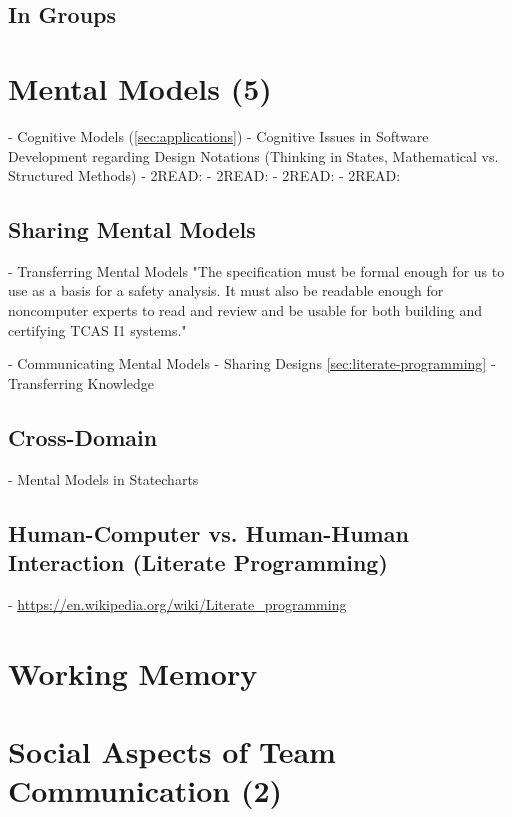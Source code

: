 \subsection{In Groups}

\section{Mental Models (5)}
- Cognitive Models (\ref{sec:applications}) \autocite[276]{kitchenham_research_1990}
- Cognitive Issues in Software Development regarding Design Notations (Thinking in States, Mathematical vs. Structured Methods) \autocite[281--282]{kitchenham_research_1990}
- 2READ: \autocite{gentner_mental_2014}
- 2READ: \autocite{dutke_mentale_1994}
- 2READ: \autocite{herczeg_software-ergonomie_2018}
- 2READ: \autocite{wandmacher_software-ergonomie_1993}
\subsection{Sharing Mental Models}
- Transferring Mental Models "The specification must be formal enough for us to use as a basis for a safety analysis. It must also be readable enough for noncomputer experts to read and review and be usable for both building and certifying TCAS I1 systems." \autocite[32]{leveson_experiences_1991}

- Communicating Mental Models \autocite[275]{kitchenham_research_1990}
- Sharing Designs \ref{sec:literate-programming} \autocite[282]{kitchenham_research_1990}
- Transferring Knowledge \autocite[234--235]{naur_programming_1985}
\subsection{Cross-Domain}
- Mental Models in Statecharts \autocite[2]{harel_statecharts_2007}
\subsection{Human-Computer vs. Human-Human Interaction (Literate Programming)}
- \url{https://en.wikipedia.org/wiki/Literate_programming}

\section{Working Memory}
\label{sec:working-memory}

\section{Social Aspects of Team Communication (2)}